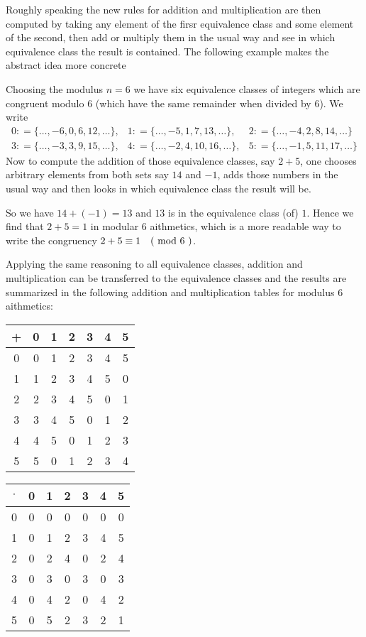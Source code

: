 Roughly speaking the new rules for addition and multiplication are then computed by taking any element of the firsr equivalence class and some element of the second, then add or multiply them in the usual way and see in which equivalence class the result is contained.
The following example makes the abstract idea more concrete
\begin{example} 
\label{def_residue_ring_z_6}
Choosing the modulus $ n = 6 $ we have six equivalence classes of integers which are congruent modulo $ 6 $ (which have the same remainder when divided by $6$). We write
$$
\begin{array}{lll}
0: = \{\ldots, -6,0,6,12, \ldots \}, &
1: = \{\ldots, -5,1,7,13, \ldots \}, &
2: = \{\ldots, -4,2,8,14, \ldots \} \\
3: = \{\ldots, -3,3,9,15, \ldots \}, &
4: = \{\ldots, -2,4,10,16, \ldots \}, &
5: = \{\ldots, -1,5,11,17, \ldots \}
\end{array}
$$
Now to compute the addition of those equivalence classes, say $2+5$, one chooses arbitrary elements from both sets say $14$ and $-1$, adds those numbers in the usual way and then looks in which equivalence class the result will be. 

So we have $14+(-1)=13$ and $13$ is in the equivalence class (of) $1$. Hence we find that $2+5=1$ in modular $6$ aithmetics, which is a more readable way to write the congruency $2+5 \equiv 1 \quad \text{( mod } 6 \text{ )}$.

Applying the same reasoning to all equivalence classes, addition and multiplication can  be transferred to the equivalence classes and the results are summarized in the following addition and multiplication tables for modulus $6$ aithmetics:
\begin{center}
  \begin{tabular}{c | c c c c c c}
    + & 0 & 1 & 2 & 3 & 4 & 5\\\hline
    0 & 0 & 1 & 2 & 3 & 4 & 5 \\
    1 & 1 & 2 & 3 & 4 & 5 & 0\\
    2 & 2 & 3 & 4 & 5 & 0 & 1\\
    3 & 3 & 4 & 5 & 0 & 1 & 2\\
    4 & 4 & 5 & 0 & 1 & 2 & 3\\
    5 & 5 & 0 & 1 & 2 & 3 & 4
  \end{tabular} \quad \quad \quad \quad
  \begin{tabular}{c | c c c c c c}
$ \cdot $ & 0 & 1 & 2 & 3 & 4 & 5 \\\hline
        0 & 0 & 0 & 0 & 0 & 0 & 0\\
        1 & 0 & 1 & 2 & 3 & 4 & 5\\
        2 & 0 & 2 & 4 & 0 & 2 & 4\\
        3 & 0 & 3 & 0 & 3 & 0 & 3\\
        4 & 0 & 4 & 2 & 0 & 4 & 2\\
        5 & 0 & 5 & 2 & 3 & 2 & 1
  \end{tabular}
\end{center}


\end{example}
